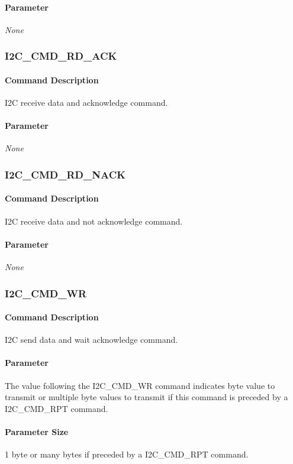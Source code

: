 \paragraph{Parameter}
\textit{None}

\subsubsection{I2C\_CMD\_RD\_ACK}
\paragraph{Command Description}
I2C receive data and acknowledge command.
\paragraph{Parameter}
\textit{None}

\subsubsection{I2C\_CMD\_RD\_NACK}
\paragraph{Command Description}
I2C receive data and not acknowledge command.
\paragraph{Parameter}
\textit{None}

\subsubsection{I2C\_CMD\_WR}
\paragraph{Command Description}
I2C send data and wait acknowledge command.
\paragraph{Parameter}
The value following the I2C\_CMD\_WR command indicates byte value to transmit or multiple byte values to transmit if this command is preceded by a I2C\_CMD\_RPT command.
\paragraph{Parameter Size}
1 byte or many bytes if preceded by a  I2C\_CMD\_RPT command.


